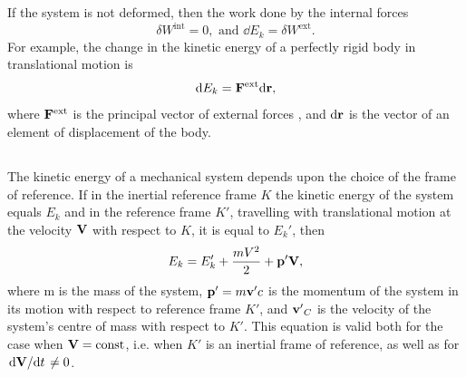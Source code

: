 If the system is not deformed, then the work done by the inter­nal forces
\begin{equation*}%
\delta W^{\textrm{int}} =0, \,\,\textrm{and}\,\, \dd E_{k} = \delta W^{\textrm{ext}}.
\end{equation*}
For example, the change in the kinetic energy of a perfectly rigid body in translational motion is
\begin{equation*}%
\dd E_{k} = \vb{F}^{\textrm{ext}} \dd \vb{r},
\end{equation*}
where $\vb{F}^{\textrm{ext}}$ is the principal vector of external forces , and $\dd \vb{r}$ is the vector of an element of displacement of the body.

\subsection{}\label{3.2.4} The kinetic energy of a mechanical system depends upon the choice of the frame of reference. If in the inertial reference frame $K$ the kinetic energy of the system equals  $E_{k}$ and in the reference frame $K'$, travelling with translational motion at the velocity $\vb{V}$ with respect to $K$, it is equal to $E_{k}'$, then
\begin{equation*}%
E_{k} = E_{k}' + \frac{mV^{2}}{2} + \vb{p'V},
\end{equation*}
where m is the mass of the system, $\vb{p'} = m\vb{v'}c$ is the momentum
of the system in its motion with respect to reference frame $K'$, and $\vb{v'}_{C}$ is the velocity of the system's centre of mass with re­spect to $K'$. This equation is valid both for the case when $\vb{V} = \textrm{const}$, i.e. when $K'$ is an inertial frame of reference, as well as for $\dv*{\vb{V}}{t} \neq 0$.

